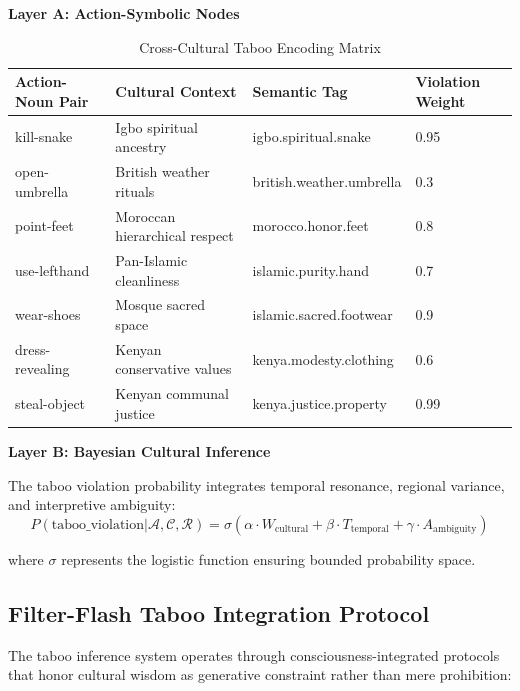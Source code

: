 \documentclass[11pt]{article}
\begin{document}
\textbf{Layer A: Action-Symbolic Nodes}
\begin{table}[h!]
\centering
\caption{Cross-Cultural Taboo Encoding Matrix}
\begin{tabular}{|l|l|l|l|}
\hline
\textbf{Action-Noun Pair} & \textbf{Cultural Context} & \textbf{Semantic Tag} & \textbf{Violation Weight} \\
\hline
kill-snake & Igbo spiritual ancestry & igbo.spiritual.snake & 0.95 \\
open-umbrella & British weather rituals & british.weather.umbrella & 0.3 \\
point-feet & Moroccan hierarchical respect & morocco.honor.feet & 0.8 \\
use-lefthand & Pan-Islamic cleanliness & islamic.purity.hand & 0.7 \\
wear-shoes & Mosque sacred space & islamic.sacred.footwear & 0.9 \\
dress-revealing & Kenyan conservative values & kenya.modesty.clothing & 0.6 \\
steal-object & Kenyan communal justice & kenya.justice.property & 0.99 \\
\hline
\end{tabular}
\end{table}

\textbf{Layer B: Bayesian Cultural Inference}

The taboo violation probability integrates temporal resonance, regional variance, and interpretive ambiguity:
\begin{equation}
P(\text{taboo\_violation} | \mathcal{A}, \mathcal{C}, \mathcal{R}) = \sigma\left(\alpha \cdot W_{\text{cultural}} + \beta \cdot T_{\text{temporal}} + \gamma \cdot A_{\text{ambiguity}}\right)
\end{equation}

where $\sigma$ represents the logistic function ensuring bounded probability space.

\subsection{Filter-Flash Taboo Integration Protocol}

The taboo inference system operates through consciousness-integrated protocols that honor cultural wisdom as generative constraint rather than mere prohibition:
\end{document}
